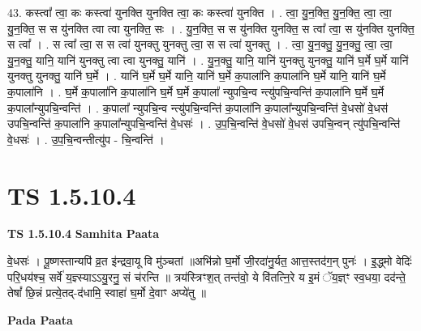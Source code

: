 \documentclass[17pt]{extarticle}
\begin{document}
43. कस्त्वा᳚ त्वा॒ कः कस्त्वा॑ युनक्ति युनक्ति त्वा॒ कः कस्त्वा॑ युनक्ति । . त्वा॒ यु॒न॒क्ति॒ यु॒न॒क्ति॒ त्वा॒ त्वा॒ यु॒न॒क्ति॒ स स यु॑नक्ति त्वा त्वा युनक्ति॒ सः । . यु॒न॒क्ति॒ स स यु॑नक्ति युनक्ति॒ स त्वा᳚ त्वा॒ स यु॑नक्ति युनक्ति॒ स त्वा᳚ । . स त्वा᳚ त्वा॒ स स त्वा॑ युनक्तु युनक्तु त्वा॒ स स त्वा॑ युनक्तु । . त्वा॒ यु॒न॒क्तु॒ यु॒न॒क्तु॒ त्वा॒ त्वा॒ यु॒न॒क्तु॒ यानि॒ यानि॑ युनक्तु त्वा त्वा युनक्तु॒ यानि॑ । . यु॒न॒क्तु॒ यानि॒ यानि॑ युनक्तु युनक्तु॒ यानि॑ घ॒र्मे घ॒र्मे यानि॑ युनक्तु युनक्तु॒ यानि॑ घ॒र्मे । . यानि॑ घ॒र्मे घ॒र्मे यानि॒ यानि॑ घ॒र्मे क॒पाला॑नि क॒पाला॑नि घ॒र्मे यानि॒ यानि॑ घ॒र्मे क॒पाला॑नि । . घ॒र्मे क॒पाला॑नि क॒पाला॑नि घ॒र्मे घ॒र्मे क॒पाला᳚ न्युपचि॒न्व न्त्यु॑पचि॒न्वन्ति॑ क॒पाला॑नि घ॒र्मे घ॒र्मे क॒पाला᳚न्युपचि॒न्वन्ति॑ । . क॒पाला᳚ न्युपचि॒न्व न्त्यु॑पचि॒न्वन्ति॑ क॒पाला॑नि क॒पाला᳚न्युपचि॒न्वन्ति॑ वे॒धसो॑ वे॒धस॑ उपचि॒न्वन्ति॑ क॒पाला॑नि क॒पाला᳚न्युपचि॒न्वन्ति॑ वे॒धसः॑ । . उ॒प॒चि॒न्वन्ति॑ वे॒धसो॑ वे॒धस॑ उपचि॒न्वन् त्यु॑पचि॒न्वन्ति॑ वे॒धसः॑ । . उ॒प॒चि॒न्वन्तीत्यु॑प - चि॒न्वन्ति॑ । \newline
\pagebreak
{}
\section*{ TS 1.5.10.4 }

\textbf{TS 1.5.10.4 } \newline
\textbf{Samhita Paata} \newline

वे॒धसः॑ । पू॒ष्णस्तान्यपि॑ व्र॒त इ॑न्द्रवा॒यू वि मु॑ञ्चतां ॥अभि॑न्नो घ॒र्मो जी॒रदा॑नु॒र्यत॒ आत्त॒स्तद॑ग॒न् पुनः॑ । इ॒द्ध्मो वेदिः॑ परि॒धय॑श्च॒ सर्वे॑ य॒ज्ञ्स्याऽऽयु॒रनु॒ सं च॑रन्ति ॥ त्रय॑स्त्रिꣳश॒त् तन्त॑वो॒॒ ये वि॑तत्नि॒रे य इ॒मं ॅय॒ज्ञ्ꣳ स्व॒धया॒ दद॑न्ते॒ तेषां᳚ छि॒न्नं प्रत्ये॒तद्-द॑धामि॒ स्वाहा॑ घ॒र्मो दे॒वाꣳ अप्ये॑तु ॥ \newline

\textbf{Pada Paata} \newline
\end{document}
